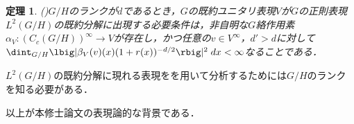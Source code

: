 \documentclass[12pt,dvipdfmx,uplatex]{jsarticle}
\newcounter{countabst}
\newtheorem{thm-a}[countabst]{定理}
\newtheorem{def-a}[countabst]{定義}
\begin{document}
\begin{thm-a}(\cite[pp.~665--6]{ber88})\label{thm:plancherel}
  $G/H$のランクが$d$であるとき，$G$の既約ユニタリ表現$V$が$G$の正則表現$L^2(G/H)$の既約分解に出現する必要条件は，非自明な$G$絡作用素$\alpha_V\colon (C_c(G/H))^{\infty}\to V $が存在し，かつ任意の$v\in V^{\infty} $，$d' > d$に対して$\dint_{G/H}\lbig|\beta_V(v)(x)(1+r(x))^{-d/2} \rbig|^2\; dx < \infty $なることである．%
\end{thm-a}

$L^2(G/H)$の既約分解に現れる表現をを用いて分析するためには$G/H$のランクを知る必要がある．


以上が本修士論文の表現論的な背景である．



\end{document}
